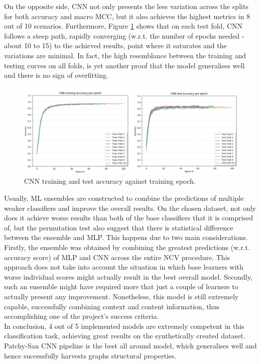 On the opposite side, CNN not only presents the less variation across the splits for both accuracy and macro MCC, but it also achieves the highest metrics in 8 out of 10 scenarios. Furthermore, Figure \ref{cnn_train_test} shows that on each test fold, CNN follows a steep path, rapidly converging (w.r.t. the number of epochs needed - about 10 to 15) to the achieved results, point where it saturates and the variations are minimal. In fact, the high resemblance between the training and testing curves on all folds, is yet another proof that the model generalises well and there is no sign of overfitting. 

\begin{figure}[H]
  \centering
  \centerline{\includegraphics[scale=0.475]{Images/cnn_train_test.png}}
  \caption{CNN training and test accuracy against training epoch.}
  \label{cnn_train_test}
\end{figure}

Usually, ML ensembles are constructed to combine the predictions of multiple weaker classifiers and improve the overall results. On the chosen dataset, not only does it achieve worse results than both of the base classifiers that it is comprised of, but the permutation test also suggest that there is statistical difference between the ensemble and MLP. This happens due to two main considerations. Firstly, the ensemble was obtained by combining the greatest predictions (w.r.t. accuracy score) of MLP and CNN across the entire NCV procedure. This approach does not take into account the situation in which base learners with worse individual scores might actually result in the best overall model. Secondly, such an ensemble might have required more that just a couple of learners to actually present any improvement. Nonetheless, this model is still extremely capable, successfully combining context and content information, thus accomplishing one of the project's success criteria. \\

In conclusion, 4 out of 5 implemented models are extremely competent in this classification task, achieving great results on the synthetically created dataset. Patchy-San CNN pipeline is the best all around model, which generalises well and hence successfully harvests graphs structural properties. 

